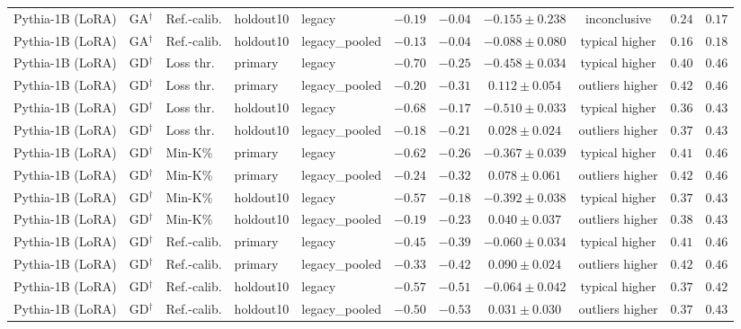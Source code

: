 {\begin{longtable}{@{\extracolsep{\fill}}lllllcccccc@{}}
Pythia-1B (LoRA) & GA$^{\dagger}$ & Ref.-calib. & holdout10 & legacy & $-0.19$ & $-0.04$ & $-0.155 \pm 0.238$ & inconclusive & $0.24$ & $0.17$ \\
Pythia-1B (LoRA) & GA$^{\dagger}$ & Ref.-calib. & holdout10 & legacy\_pooled & $-0.13$ & $-0.04$ & $-0.088 \pm 0.080$ & typical higher & $0.16$ & $0.18$ \\
Pythia-1B (LoRA) & GD$^{\dagger}$ & Loss thr. & primary & legacy & $-0.70$ & $-0.25$ & $-0.458 \pm 0.034$ & typical higher & $0.40$ & $0.46$ \\
Pythia-1B (LoRA) & GD$^{\dagger}$ & Loss thr. & primary & legacy\_pooled & $-0.20$ & $-0.31$ & $0.112 \pm 0.054$ & outliers higher & $0.42$ & $0.46$ \\
Pythia-1B (LoRA) & GD$^{\dagger}$ & Loss thr. & holdout10 & legacy & $-0.68$ & $-0.17$ & $-0.510 \pm 0.033$ & typical higher & $0.36$ & $0.43$ \\
Pythia-1B (LoRA) & GD$^{\dagger}$ & Loss thr. & holdout10 & legacy\_pooled & $-0.18$ & $-0.21$ & $0.028 \pm 0.024$ & outliers higher & $0.37$ & $0.43$ \\
Pythia-1B (LoRA) & GD$^{\dagger}$ & Min-K\% & primary & legacy & $-0.62$ & $-0.26$ & $-0.367 \pm 0.039$ & typical higher & $0.41$ & $0.46$ \\
Pythia-1B (LoRA) & GD$^{\dagger}$ & Min-K\% & primary & legacy\_pooled & $-0.24$ & $-0.32$ & $0.078 \pm 0.061$ & outliers higher & $0.42$ & $0.46$ \\
Pythia-1B (LoRA) & GD$^{\dagger}$ & Min-K\% & holdout10 & legacy & $-0.57$ & $-0.18$ & $-0.392 \pm 0.038$ & typical higher & $0.37$ & $0.43$ \\
Pythia-1B (LoRA) & GD$^{\dagger}$ & Min-K\% & holdout10 & legacy\_pooled & $-0.19$ & $-0.23$ & $0.040 \pm 0.037$ & outliers higher & $0.38$ & $0.43$ \\
Pythia-1B (LoRA) & GD$^{\dagger}$ & Ref.-calib. & primary & legacy & $-0.45$ & $-0.39$ & $-0.060 \pm 0.034$ & typical higher & $0.41$ & $0.46$ \\
Pythia-1B (LoRA) & GD$^{\dagger}$ & Ref.-calib. & primary & legacy\_pooled & $-0.33$ & $-0.42$ & $0.090 \pm 0.024$ & outliers higher & $0.42$ & $0.46$ \\
Pythia-1B (LoRA) & GD$^{\dagger}$ & Ref.-calib. & holdout10 & legacy & $-0.57$ & $-0.51$ & $-0.064 \pm 0.042$ & typical higher & $0.37$ & $0.42$ \\
Pythia-1B (LoRA) & GD$^{\dagger}$ & Ref.-calib. & holdout10 & legacy\_pooled & $-0.50$ & $-0.53$ & $0.031 \pm 0.030$ & outliers higher & $0.37$ & $0.43$ \\

\end{longtable}}
